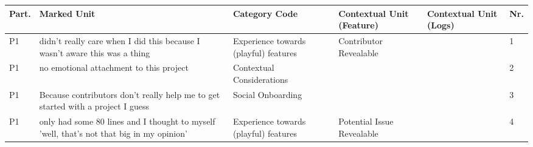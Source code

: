 \begin{appendices}
  \begin{landscape}
    \begin{longtable}{|p{0.8cm}|p{7cm}|p{3cm}|p{3cm}|p{5.5cm}|p{0.5cm}|}
      \hline
      \textbf{Part.} & \textbf{Marked Unit}                                                                                                                                                                                                                                                        & \textbf{Category Code}                   & \textbf{Contextual Unit (Feature)} & \textbf{Contextual Unit (Logs)}                                                                                                                    & \textbf{Nr.} \\ \hline
      \endhead
      P1                   & didn't really care when I did this because I wasn't aware this was a thing                                                                                                                                                                                                  & Experience towards (playful) features    & Contributor Revealable             &                                                                                                                                                    & 1            \\ \hline
      P1                   & no emotional attachment to this project                                                                                                                                                                                                                                     & Contextual Considerations                &                                    &                                                                                                                                                    & 2            \\ \hline
      P1                   & Because contributors don't really help me to get started with a project I guess                                                                                                                                                                                             & Social Onboarding                        &                                    &                                                                                                                                                    & 3            \\ \hline
      P1                   & only had some 80 lines and I thought to myself 'well, that's not that big in my opinion'                                                                                                                                                                                    & Experience towards (playful) features    & Potential Issue Revealable         &                                                                                                                                                    & 4            \\ \hline

\end{longtable}
\end{landscape}
\end{appendices}
